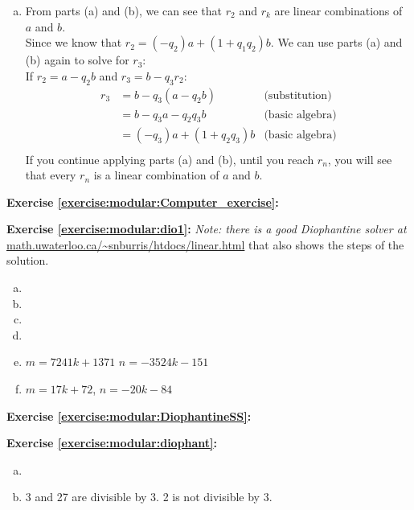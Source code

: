 \begin{enumerate}[(a)]
\item
From parts (a) and (b), we can see that $r_{2}$ and $r_{k}$ are linear combinations of $a$ and $b$.\\
Since we know that $r_{2} = (-q_{2})a + (1 + q_{1}q_{2})b$. We can use parts (a) and (b) again to solve for $r_{3}$:\\
If $r_{2} = a - q_{2}b$ and $r_{3} = b - q_{3}r_{2}$:
\begin{align*}
r_{3} &= b - q_{3}(a - q_{2}b) &\text{(substitution)}\\
&= b - q_{3}a - q_{2}q_{3}b &\text{(basic algebra)}\\
&= (-q_{3})a + (1 + q_{2}q_{3})b &\text{(basic algebra)}\\
\end{align*}
If you continue applying parts (a) and (b), until you reach $r_{n}$, you will see that every $r_{n}$ is a linear combination of $a$ and $b$.
\end{enumerate}

\noindent\textbf{Exercise \ref{exercise:modular:Computer_exercise}:}

\noindent\textbf{Exercise \ref{exercise:modular:dio1}:} 
\emph{Note: there is a good  Diophantine solver at} \url{math.uwaterloo.ca/~snburris/htdocs/linear.html} that also shows
the steps of the solution.
\begin{enumerate} [(a)]
\item
\item
\item
\item
\item
$m=7241k+1371$ $n=-3524k-151$
\item
$m=17k+72$, $n=-20k-84$
\end{enumerate}

\noindent\textbf{Exercise \ref{exercise:modular:DiophantineSS}:}

\noindent\textbf{Exercise \ref{exercise:modular:diophant}:}
\begin{enumerate} [(a)]
\item
\item
3 and 27 are divisible by 3. 2 is not divisible by 3.
\end{enumerate}

